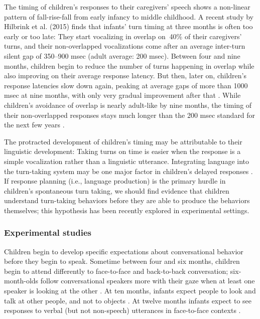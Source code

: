 \documentclass[authoryear, 12pt]{elsarticle}
\begin{document}
The timing of children's responses to their caregivers' speech shows a non-linear pattern of fall-rise-fall from early infancy to middle childhood. A recent study by Hilbrink et al. (2015) finds that infants' turn timing at three months is often too early or too late: They start vocalizing in overlap on $~$40\% of their caregivers' turns, and their non-overlapped vocalizations come after an average inter-turn silent gap of 350--900 msec (adult average: 200 msec). Between four and nine months, children begin to reduce the number of turns happening in overlap while also improving on their average response latency. But then, later on, children's response latencies slow down again, peaking at average gaps of more than 1000 msec at nine months, with only very gradual improvement after that \citep{hilbrink2015}. While children's avoidance of overlap is nearly adult-like by nine months, the timing of their non-overlapped responses stays much longer than the 200 msec standard for the next few years \citep{garvey1984, ervin-tripp1979}.

The protracted development of children's timing may be attributable to their linguistic development: Taking turns on time is easier when the response is a simple vocalization rather than a linguistic utterance. Integrating language into the turn-taking system may be one major factor in children's delayed responses \citep{casillas2016}. If response planning (i.e., language production) is the primary hurdle in children's spontaneous turn taking, we should find evidence that children understand turn-taking behaviors before they are able to produce the behaviors themselves; this hypothesis has been recently explored in experimental settings.

\subsubsection{Experimental studies}

Children begin to develop specific expectations about conversational behavior before they begin to speak. Sometime between four and six months, children begin to attend differently to face-to-face and back-to-back conversation; six-month-olds follow conversational speakers more with their gaze when at least one speaker is looking at the other \citep{augusti2010}. At ten months, infants expect people to look and talk at other people, and not to objects \citep{beier2012}. At twelve months infants expect to see responses to verbal (but not non-speech) utterances in face-to-face contexts \citep{thorgrimsson2015}.
\end{document}
